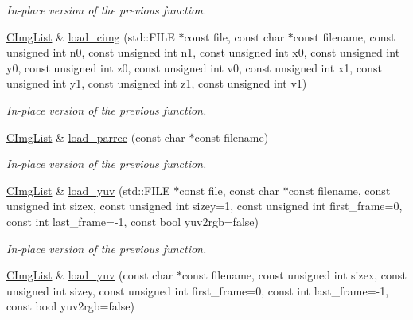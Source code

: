 \begin{DoxyCompactItemize}
\begin{DoxyCompactList}\small\item\em In-\/place version of the previous function. \end{DoxyCompactList}\item 
\hypertarget{structcimg__library_1_1_c_img_list_a6f2a8a837eb9a16212abae7cc59d227c}{\hyperlink{structcimg__library_1_1_c_img_list}{C\-Img\-List} \& \hyperlink{structcimg__library_1_1_c_img_list_a6f2a8a837eb9a16212abae7cc59d227c}{load\-\_\-cimg} (std\-::\-F\-I\-L\-E $\ast$const file, const char $\ast$const filename, const unsigned int n0, const unsigned int n1, const unsigned int x0, const unsigned int y0, const unsigned int z0, const unsigned int v0, const unsigned int x1, const unsigned int y1, const unsigned int z1, const unsigned int v1)}\label{structcimg__library_1_1_c_img_list_a6f2a8a837eb9a16212abae7cc59d227c}

\begin{DoxyCompactList}\small\item\em In-\/place version of the previous function. \end{DoxyCompactList}\item 
\hypertarget{structcimg__library_1_1_c_img_list_a6efa0324a9075a6a64c3a8a05f454867}{\hyperlink{structcimg__library_1_1_c_img_list}{C\-Img\-List} \& \hyperlink{structcimg__library_1_1_c_img_list_a6efa0324a9075a6a64c3a8a05f454867}{load\-\_\-parrec} (const char $\ast$const filename)}\label{structcimg__library_1_1_c_img_list_a6efa0324a9075a6a64c3a8a05f454867}

\begin{DoxyCompactList}\small\item\em In-\/place version of the previous function. \end{DoxyCompactList}\item 
\hypertarget{structcimg__library_1_1_c_img_list_affe0c198e2e48c1b12b285f3839b6507}{\hyperlink{structcimg__library_1_1_c_img_list}{C\-Img\-List} \& \hyperlink{structcimg__library_1_1_c_img_list_affe0c198e2e48c1b12b285f3839b6507}{load\-\_\-yuv} (std\-::\-F\-I\-L\-E $\ast$const file, const char $\ast$const filename, const unsigned int sizex, const unsigned int sizey=1, const unsigned int first\-\_\-frame=0, const int last\-\_\-frame=-\/1, const bool yuv2rgb=false)}\label{structcimg__library_1_1_c_img_list_affe0c198e2e48c1b12b285f3839b6507}

\begin{DoxyCompactList}\small\item\em In-\/place version of the previous function. \end{DoxyCompactList}\item 
\hypertarget{structcimg__library_1_1_c_img_list_a4cdbbcd088ae3b804fda7f74176f3600}{\hyperlink{structcimg__library_1_1_c_img_list}{C\-Img\-List} \& \hyperlink{structcimg__library_1_1_c_img_list_a4cdbbcd088ae3b804fda7f74176f3600}{load\-\_\-yuv} (const char $\ast$const filename, const unsigned int sizex, const unsigned int sizey, const unsigned int first\-\_\-frame=0, const int last\-\_\-frame=-\/1, const bool yuv2rgb=false)}\label{structcimg__library_1_1_c_img_list_a4cdbbcd088ae3b804fda7f74176f3600}


\end{DoxyCompactItemize}
